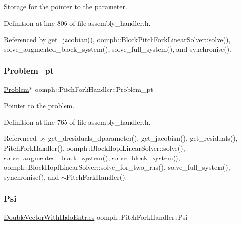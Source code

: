 Storage for the pointer to the parameter. 



Definition at line 806 of file assembly\+\_\+handler.\+h.



Referenced by get\+\_\+jacobian(), oomph\+::\+Block\+Pitch\+Fork\+Linear\+Solver\+::solve(), solve\+\_\+augmented\+\_\+block\+\_\+system(), solve\+\_\+full\+\_\+system(), and synchronise().

\mbox{\label{classoomph_1_1PitchForkHandler_a196adc8e79a66292d2df9bd9093f8f73}} 
\subsubsection{\texorpdfstring{Problem\+\_\+pt}{Problem\_pt}}
{\footnotesize\ttfamily \hyperlink{classoomph_1_1Problem}{Problem}$\ast$ oomph\+::\+Pitch\+Fork\+Handler\+::\+Problem\+\_\+pt\hspace{0.3cm}{\ttfamily [private]}}



Pointer to the problem. 



Definition at line 765 of file assembly\+\_\+handler.\+h.



Referenced by get\+\_\+dresiduals\+\_\+dparameter(), get\+\_\+jacobian(), get\+\_\+residuals(), Pitch\+Fork\+Handler(), oomph\+::\+Block\+Hopf\+Linear\+Solver\+::solve(), solve\+\_\+augmented\+\_\+block\+\_\+system(), solve\+\_\+block\+\_\+system(), oomph\+::\+Block\+Hopf\+Linear\+Solver\+::solve\+\_\+for\+\_\+two\+\_\+rhs(), solve\+\_\+full\+\_\+system(), synchronise(), and $\sim$\+Pitch\+Fork\+Handler().

\mbox{\label{classoomph_1_1PitchForkHandler_aa04d0f340d919d4da3f9199eb76649b1}} 
\subsubsection{\texorpdfstring{Psi}{Psi}}
{\footnotesize\ttfamily \hyperlink{classoomph_1_1DoubleVectorWithHaloEntries}{Double\+Vector\+With\+Halo\+Entries} oomph\+::\+Pitch\+Fork\+Handler\+::\+Psi\hspace{0.3cm}{\ttfamily [private]}}



